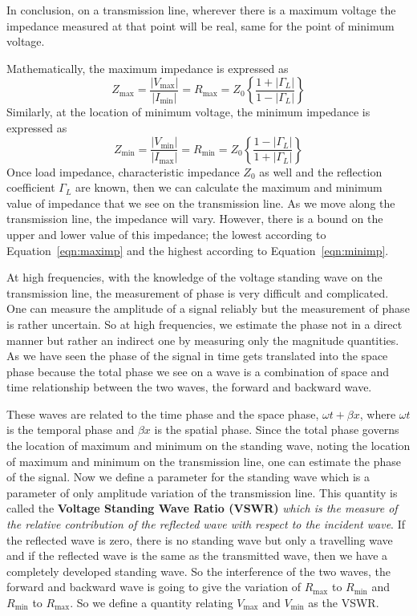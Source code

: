 In conclusion, on a transmission line, wherever there is a maximum voltage the impedance measured at that point will be real, same for the point of minimum voltage.

Mathematically, the maximum impedance is expressed as
\begin{dmath}
Z_{\max} = \frac{|V_{\max}|}{|I_{\min}|} 
= R_{\max}
= Z_0\left\{\frac{1+|\Gamma_L|}{1-|\Gamma_L|}\right\}
\label{eqn:maximp}
\end{dmath}
Similarly, at the location of minimum voltage, the minimum impedance is expressed as
\begin{dmath}
Z_{\min}=\frac{|V_{\min}|}{|I_{\max}|} 
= R_{\min}=Z_0\left\{\frac{1-|\Gamma_L|}{1+|\Gamma_L|} \right\}
\label{eqn:minimp}
\end{dmath}
Once load impedance, characteristic impedance $Z_0$ as well and the reflection coefficient $\Gamma_L$ are known, then we can calculate the maximum and minimum value of impedance that we see on the transmission line. As we move along the transmission line, the impedance will vary. However, there is a bound on the upper and lower value of this impedance; the lowest according to Equation~\eqref{eqn:maximp} and the highest according to Equation~\eqref{eqn:minimp}.

At high frequencies, with the knowledge of the voltage standing wave on the transmission line, the measurement of phase is very difficult and complicated. One can measure the amplitude of a signal reliably but the measurement of phase is rather uncertain. So at high frequencies, we estimate the phase not in a direct manner but rather an indirect one by measuring only the magnitude quantities. As we have seen the phase of the signal in time gets translated into the space phase because the total phase we see on a wave is a combination of space and time relationship between the two waves, the forward and backward wave. 

These waves are related to the time phase and the space phase, $\omega t + \beta x$, where $\omega t$ is the temporal phase and $\beta x$ is the spatial phase. Since the total phase governs the location of maximum and minimum on the standing wave, noting the location of maximum and minimum on the transmission line, one can estimate the phase of the signal. Now we define a parameter for the standing wave which is a parameter of only amplitude variation of the transmission line. This quantity is called the \textbf{Voltage Standing Wave Ratio (VSWR)} \emph{which is the measure of the relative contribution of the reflected wave with respect to the incident wave}. If the reflected wave is zero, there is no standing wave but only a travelling wave and if the reflected wave is the same as the transmitted wave, then we have a completely developed standing wave. So the interference of the two waves, the forward and backward wave is going to give the variation of $R_{\max}$ to $R_{\min}$ and $R_{\min}$ to $R_{\max}$. So we define a quantity relating $V_{\max}$ and $V_{\min}$ as the VSWR.

